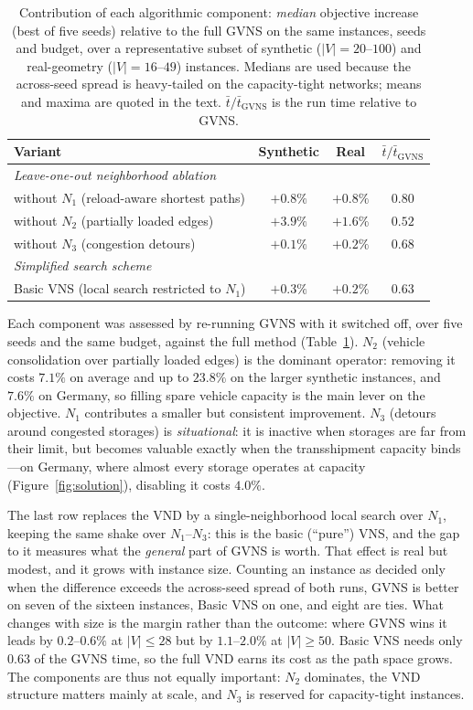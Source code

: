 \documentclass[runningheads]{llncs}
\begin{document}
\begin{table}[t]
\centering
\caption{Contribution of each algorithmic component: \emph{median} objective
increase (best of five seeds) relative to the full GVNS on the same instances,
seeds and budget, over a representative subset of synthetic ($|V|=20$--$100$) and
real-geometry ($|V|=16$--$49$) instances. Medians are used because the across-seed
spread is heavy-tailed on the capacity-tight networks; means and maxima are quoted
in the text. $\bar t/\bar t_{\mathrm{GVNS}}$ is the run time relative to GVNS.}
\label{tab:components}
\small
\begin{tabular}{lccc}
\toprule
Variant & Synthetic & Real & $\bar t/\bar t_{\mathrm{GVNS}}$\\
\midrule
\multicolumn{4}{l}{\emph{Leave-one-out neighborhood ablation}}\\
without $N_1$ (reload-aware shortest paths) & $+0.8\%$ & $+0.8\%$ & $0.80$\\
without $N_2$ (partially loaded edges)      & $+3.9\%$ & $+1.6\%$ & $0.52$\\
without $N_3$ (congestion detours)          & $+0.1\%$ & $+0.2\%$ & $0.68$\\
\midrule
\multicolumn{4}{l}{\emph{Simplified search scheme}}\\
Basic VNS (local search restricted to $N_1$) & $+0.3\%$ & $+0.2\%$ & $0.63$\\
\bottomrule
\end{tabular}
\end{table}
Each component was assessed by re-running GVNS with it switched off, over five
seeds and the same budget, against the full method (Table~\ref{tab:components}).
$N_2$ (vehicle consolidation over partially loaded edges) is the dominant
operator: removing it costs $7.1\%$ on average and up to $23.8\%$ on the larger
synthetic instances, and $7.6\%$ on Germany, so filling spare vehicle capacity is
the main lever on the objective. $N_1$ contributes a smaller but consistent
improvement. $N_3$ (detours around congested storages) is \emph{situational}: it
is inactive when storages are far from their limit, but becomes valuable exactly
when the transshipment capacity binds---on Germany, where almost every storage
operates at capacity (Figure~\ref{fig:solution}), disabling it costs $4.0\%$.

The last row replaces the VND by a single-neighborhood local search over $N_1$,
keeping the same shake over $N_1$--$N_3$: this is the basic (``pure'') VNS, and
the gap to it measures what the \emph{general} part of GVNS is worth. That effect
is real but modest, and it grows with instance size. Counting an instance as
decided only when the difference exceeds the across-seed spread of both runs, GVNS
is better on seven of the sixteen instances, Basic VNS on one, and eight are ties.
What changes with size is the margin rather than the outcome: where GVNS wins it
leads by $0.2$--$0.6\%$ at $|V|\le28$ but by $1.1$--$2.0\%$ at $|V|\ge50$. Basic
VNS needs only $0.63$ of the GVNS time, so the full VND earns its cost as the path
space grows. The components are thus not equally
important: $N_2$ dominates, the VND structure matters mainly at scale, and $N_3$
is reserved for capacity-tight instances.
\end{document}
